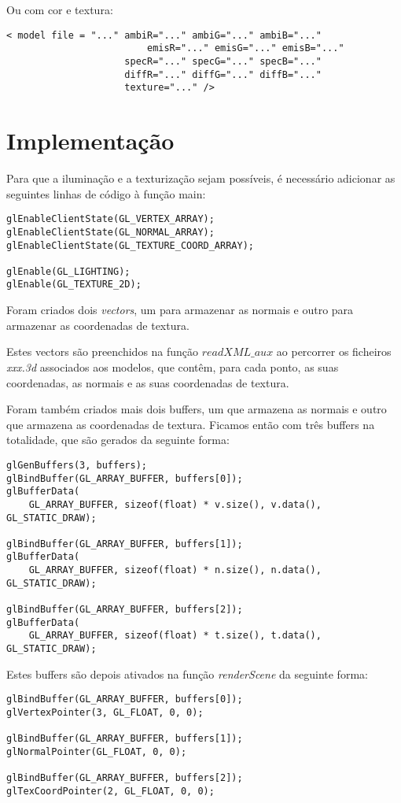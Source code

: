 \documentclass[11pt,a4paper]{report}
\begin{document}
Ou com cor e textura:
\begin{lstlisting}[style = xml]
< model file = "..." ambiR="..." ambiG="..." ambiB="..."
		                 emisR="..." emisG="..." emisB="..."
                     specR="..." specG="..." specB="..."
                     diffR="..." diffG="..." diffB="..."
                     texture="..." />
\end{lstlisting}

\section{Implementação}
Para que a iluminação e a texturização sejam possíveis, é necessário adicionar as seguintes linhas de código à função main:

\begin{lstlisting}[style = code]
glEnableClientState(GL_VERTEX_ARRAY);
glEnableClientState(GL_NORMAL_ARRAY);
glEnableClientState(GL_TEXTURE_COORD_ARRAY);

glEnable(GL_LIGHTING);
glEnable(GL_TEXTURE_2D);
\end{lstlisting}

Foram criados dois \emph{vectors}, um para armazenar as normais e outro para armazenar as coordenadas de textura.

Estes vectors são preenchidos na função {$readXML\_aux$} ao percorrer os ficheiros \emph{xxx.3d} associados aos modelos, que contêm, para cada ponto, as suas coordenadas, as normais e as suas coordenadas de textura.

Foram também criados mais dois buffers, um que armazena as normais e outro que armazena as coordenadas de textura.
\newpage
Ficamos então com três buffers na totalidade, que são gerados da seguinte forma:
\begin{lstlisting}[style = code]
glGenBuffers(3, buffers);
glBindBuffer(GL_ARRAY_BUFFER, buffers[0]);
glBufferData(
	GL_ARRAY_BUFFER, sizeof(float) * v.size(), v.data(), GL_STATIC_DRAW);

glBindBuffer(GL_ARRAY_BUFFER, buffers[1]);
glBufferData(
	GL_ARRAY_BUFFER, sizeof(float) * n.size(), n.data(), GL_STATIC_DRAW);

glBindBuffer(GL_ARRAY_BUFFER, buffers[2]);
glBufferData(
	GL_ARRAY_BUFFER, sizeof(float) * t.size(), t.data(), GL_STATIC_DRAW);
\end{lstlisting}

Estes buffers são depois ativados na função \emph{renderScene} da seguinte forma:
\begin{lstlisting}[style = code]
glBindBuffer(GL_ARRAY_BUFFER, buffers[0]);
glVertexPointer(3, GL_FLOAT, 0, 0);

glBindBuffer(GL_ARRAY_BUFFER, buffers[1]);
glNormalPointer(GL_FLOAT, 0, 0);

glBindBuffer(GL_ARRAY_BUFFER, buffers[2]);
glTexCoordPointer(2, GL_FLOAT, 0, 0);
\end{lstlisting}
\end{document}
